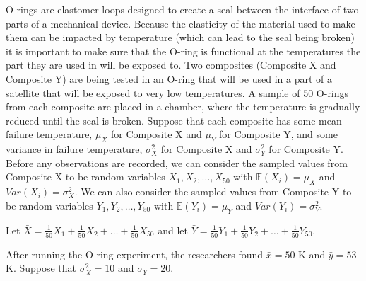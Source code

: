 \documentclass[addpoints]{examsetup}
\begin{document}
\begin{questions}
\question
O-rings are elastomer loops designed to create a seal between the interface of two parts of a mechanical device.
Because the elasticity of the material used to make them can be impacted by temperature (which can lead to the seal being broken) it is important to make sure that the O-ring is functional at the temperatures the part they are used in will be exposed to.
Two composites (Composite X and Composite Y) are being tested in an O-ring that will be used in a part of a satellite that will be exposed to very low temperatures.
A sample of 50 O-rings from each composite are placed in a chamber, where the temperature is gradually reduced until the seal is broken.
Suppose that each composite has some mean failure temperature, $\mu_X$ for Composite X and $\mu_Y$ for Composite Y, and some variance in failure temperature, 
$\sigma_X^2$ for Composite X and $\sigma_Y^2$ for Composite Y. 
Before any observations are recorded, we can consider the sampled values from Composite X to be random variables $X_1, X_2, \ldots, X_{50}$ with $\mathbb{E}(X_i) = \mu_X$ and $Var(X_i) = \sigma_X^2$.
We can also consider the sampled values from Composite Y to be random variables $Y_1, Y_2, \ldots, Y_{50}$ with $\mathbb{E}(Y_i) = \mu_Y$ and $Var(Y_i) = \sigma_Y^2$.

Let $\bar{X} = \frac{1}{50} X_1 + \frac{1}{50} X_2 + \ldots + \frac{1}{50} X_{50}$ and let $\bar{Y} = \frac{1}{50} Y_1 + \frac{1}{50} Y_2 + \ldots + \frac{1}{50} Y_{50}$.




   After running the O-ring experiment, the researchers found $\bar{x} = 50$ K and $\bar{y} = 53$ K. 
   Suppose that $\sigma_X^2 = 10$ and $\sigma_Y = 20$.
\end{questions}
\end{document}
